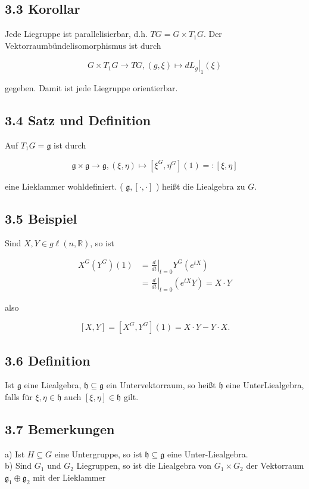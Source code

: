 \documentclass[10pt, letterpaper]{article}
\begin{document}
\subsection*{3.3 Korollar}
Jede Liegruppe ist parallelisierbar, d.h. $T G=G \times T_{1} G$. Der Vektorraumbündelisomorphismus ist durch

$$
G \times T_{1} G \rightarrow T G,\left.(g, \xi) \mapsto d L_{g}\right|_{1}(\xi)
$$

gegeben. Damit ist jede Liegruppe orientierbar.

\subsection*{3.4 Satz und Definition}
Auf $T_{1} G=\mathfrak{g}$ ist durch

$$
\mathfrak{g} \times \mathfrak{g} \rightarrow \mathfrak{g},(\xi, \eta) \mapsto\left[\xi^{G}, \eta^{G}\right](1)=:[\xi, \eta]
$$

eine Lieklammer wohldefiniert. ( $\mathfrak{g},[\cdot, \cdot]$ ) heißt die Liealgebra zu $G$.

\subsection*{3.5 Beispiel}
Sind $X, Y \in g \ell(n, \mathbb{R})$, so ist

$$
\begin{aligned}
X^{G}\left(Y^{G}\right)(1) & =\left.\frac{d}{d t}\right|_{t=0} Y^{G}\left(e^{t X}\right) \\
& =\left.\frac{d}{d t}\right|_{t=0}\left(e^{t X} Y\right)=X \cdot Y
\end{aligned}
$$

also

$$
[X, Y]=\left[X^{G}, Y^{G}\right](1)=X \cdot Y-Y \cdot X .
$$

\subsection*{3.6 Definition}
Ist $\mathfrak{g}$ eine Liealgebra, $\mathfrak{h} \subseteq \mathfrak{g}$ ein Untervektorraum, so heißt $\mathfrak{h}$ eine UnterLiealgebra, falls für $\xi, \eta \in \mathfrak{h}$ auch $[\xi, \eta] \in \mathfrak{h}$ gilt.

\subsection*{3.7 Bemerkungen}
a) Ist $H \subseteq G$ eine Untergruppe, so ist $\mathfrak{h} \subseteq \mathfrak{g}$ eine Unter-Liealgebra.\\
b) Sind $G_{1}$ und $G_{2}$ Liegruppen, so ist die Liealgebra von $G_{1} \times G_{2}$ der Vektorraum $\mathfrak{g}_{1} \oplus \mathfrak{g}_{2}$ mit der Lieklammer
\end{document}
